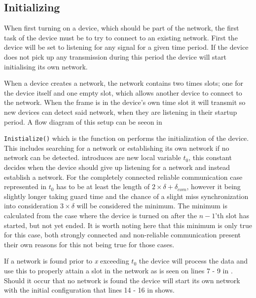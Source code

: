 \subsection{Initializing} %
\label{sub:setup} 
When first turning on a device, which should be part of the network, the first task of the device must be to try to connect to an existing network.
First the device will be set to listening for any signal for a given time period. 
If the device does not pick up any transmission during this period the device will start initialising its own network.

When a device creates a network, the network contains two times slots; one for the device itself and one empty slot, which allows another device to connect to the network.
When the frame is in the device's own time slot it will transmit so new devices can detect said network, when they are listening in their startup period.  
A flow diagram of this setup can be seeon in 

 
\bigskip \noindent
\texttt{Inistialize()} which is the function on performs the initialization of the device.
This includes searching for a network or establishing its own network if no network can be detected.
 introduces are new local variable $t_0$, this constant decides when the device should give up listening for a network and instead establish a network.
For the completely connected reliable communication case represented in  $t_0$ has to be at least the length of $2 \times \delta + \delta_{com}$, however it being slightly longer taking guard time and the chance of a slight miss synchronization into consideration $3 \times \delta$ will be considered the minimum.
The minimum is calculated from the case where the device is turned on after the $n-1$'th slot has started, but not yet ended.
It is worth noting here that this minimum is only true for this case, both strongly connected and non-reliable communication present their own reasons for this not being true for those cases.

If a network is found prior to \textit{x} exceeding $t_0$ the device will process the data and use this to properly attain a slot in the network as is seen on lines 7 - 9 in .
Should it occur that no network is found the device will start its own network with the initial configuration that lines 14 - 16 in  shows.

